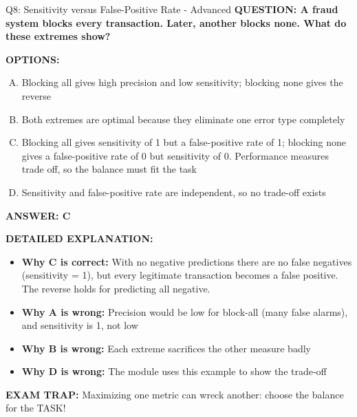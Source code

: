 \documentclass[8pt]{beamer}
\begin{document}
\begin{frame}[shrink=6]{Q8: Sensitivity versus False-Positive Rate - Advanced}
\fontsize{6.5}{7.5}\selectfont
\textbf{QUESTION: A fraud system blocks every transaction. Later, another blocks none. What do these extremes show?}

\vspace{0.1cm}
\textbf{OPTIONS:}
\begin{enumerate}[A.]
\item Blocking all gives high precision and low sensitivity; blocking none gives the reverse
\item Both extremes are optimal because they eliminate one error type completely
\item Blocking all gives sensitivity of 1 but a false-positive rate of 1; blocking none gives a false-positive rate of 0 but sensitivity of 0. Performance measures trade off, so the balance must fit the task
\item Sensitivity and false-positive rate are independent, so no trade-off exists
\end{enumerate}

\vspace{0.1cm}
\textcolor{myblue}{\textbf{ANSWER: C}}

\vspace{0.1cm}
\textbf{DETAILED EXPLANATION:}
\begin{itemize}
\item \textbf{Why C is correct:} With no negative predictions there are no false negatives (sensitivity = 1), but every legitimate transaction becomes a false positive. The reverse holds for predicting all negative.
\item \textbf{Why A is wrong:} Precision would be low for block-all (many false alarms), and sensitivity is 1, not low
\item \textbf{Why B is wrong:} Each extreme sacrifices the other measure badly
\item \textbf{Why D is wrong:} The module uses this example to show the trade-off
\end{itemize}

\textcolor{myred}{\textbf{EXAM TRAP:}} Maximizing one metric can wreck another: choose the balance for the TASK!
\end{frame}
\end{document}

